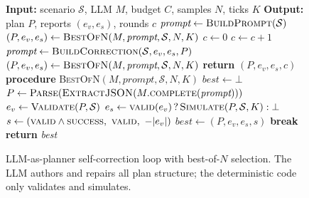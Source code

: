 \documentclass[journal]{IEEEtran}
\begin{document}
\begin{figure}[!t]
\centering
\begin{minipage}{0.96\linewidth}
\begin{algorithmic}[1]
\STATE \textbf{Input:} scenario $\mathcal{S}$, LLM $M$, budget $C$, samples $N$, ticks $K$
\STATE \textbf{Output:} plan $P$, reports $(e_v,e_s)$, rounds $c$
\STATE $\textit{prompt} \leftarrow \textsc{BuildPrompt}(\mathcal{S})$ 
\STATE $(P,e_v,e_s) \leftarrow \textsc{BestOfN}(M,\textit{prompt},\mathcal{S},N,K)$
\STATE $c \leftarrow 0$
    \STATE $c \leftarrow c+1$
    \STATE $\textit{prompt} \leftarrow \textsc{BuildCorrection}(\mathcal{S},e_v,e_s,P)$
    \STATE $(P,e_v,e_s) \leftarrow \textsc{BestOfN}(M,\textit{prompt},\mathcal{S},N,K)$
\ENDWHILE
\STATE \textbf{return} $(P,e_v,e_s,c)$
\STATE {}
\STATE \textbf{procedure} \textsc{BestOfN}$(M,\textit{prompt},\mathcal{S},N,K)$
\STATE $\textit{best} \leftarrow \bot$
    \STATE $P \leftarrow \textsc{Parse}(\textsc{ExtractJSON}(M.\textsc{complete}(\textit{prompt})))$
    \STATE $e_v \leftarrow \textsc{Validate}(P,\mathcal{S})$ 
    \STATE $e_s \leftarrow \textsc{valid}(e_v)\,?\,\textsc{Simulate}(P,\mathcal{S},K):\bot$
    \STATE $s \leftarrow (\textsc{valid}\wedge\textsc{success},\ \textsc{valid},\ -|e_v|)$
        \STATE $\textit{best} \leftarrow (P,e_v,e_s,s)$
    \ENDIF
     \STATE \textbf{break} \ENDIF
\ENDFOR
\STATE \textbf{return} \textit{best}
\end{algorithmic}
\end{minipage}
\caption{LLM-as-planner self-correction loop with best-of-$N$ selection. The LLM authors and repairs all plan structure; the deterministic code only validates and simulates.}
\label{alg:loop}
\end{figure}
\end{document}
